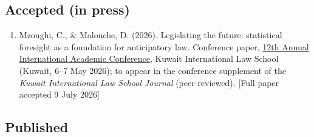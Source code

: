 \documentclass[10pt,a4paper]{article}
\begin{document}
\subsection{Accepted (in press)}
\begin{enumerate}
\item Mzoughi, C., \& Malouche, D. (2026). Legislating the future: statistical foresight as a foundation for anticipatory law. Conference paper, \href{https://kilaw.edu.kw/annualConference/en/conference-12-call-for-papers/}{12th Annual International Academic Conference}, Kuwait International Law School (Kuwait, 6--7 May 2026); to appear in the conference supplement of the \emph{Kuwait International Law School Journal} (peer-reviewed). [Full paper accepted 9 July 2026]
\end{enumerate}

\subsection{Published}
\end{document}
